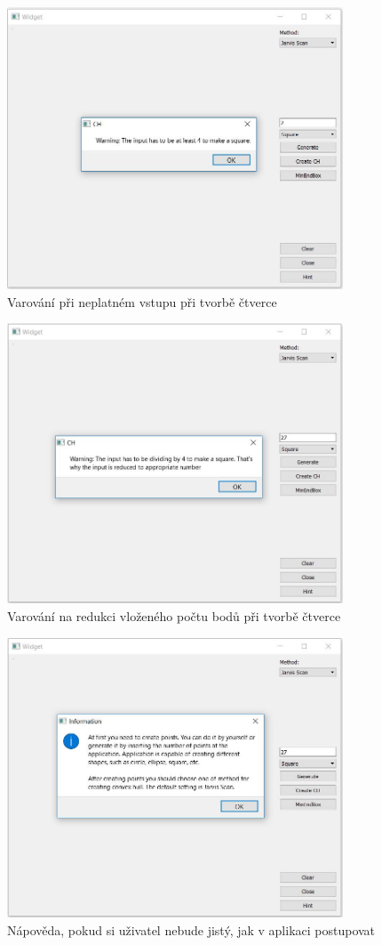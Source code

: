 \documentclass[a4paper, 12pt]{article}
\begin{document}
\begin{figure}[h!]
	\centering
	\includegraphics[width=10cm]{warning_square.jpg}
	\caption{Varování při neplatném vstupu při tvorbě čtverce}
\end{figure}

\begin{figure}[h!]
	\centering
	\includegraphics[width=10cm]{warning_square2.jpg}
	\caption{Varování na redukci vloženého počtu bodů při tvorbě čtverce}
\end{figure}

\begin{figure}[h!]
	\centering
	\includegraphics[width=10cm]{hint.jpg}
	\caption{Nápověda, pokud si uživatel nebude jistý, jak v aplikaci postupovat}
\end{figure}
\end{document}
